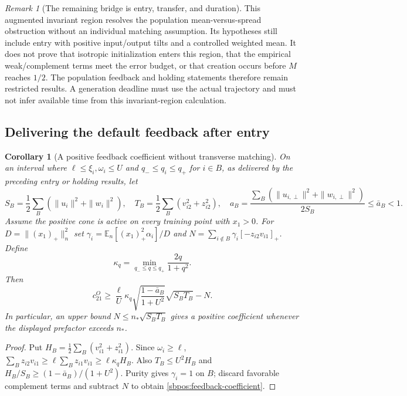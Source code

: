 \documentclass{article} %
\theoremstyle{plain}
\newtheorem{corollary}[theorem]{Corollary}
\theoremstyle{definition}
\theoremstyle{remark}
\newtheorem{remark}[theorem]{Remark}
\begin{document}
\begin{remark}[The remaining bridge is entry, transfer, and duration]
This augmented invariant region resolves the population mean-versus-spread
obstruction without an individual matching assumption. Its hypotheses
still include entry with positive input/output tilts and a controlled
weighted mean. It does not prove that isotropic initialization enters
this region, that the empirical weak/complement terms meet the error
budget, or that creation occurs before $M$ reaches $1/2$.
The population feedback and holding statements therefore remain
restricted results. A generation deadline must use the actual trajectory
and must not infer available time from this invariant-region calculation.
\end{remark}

\subsection{Delivering the default feedback after entry}

\begin{corollary}[A positive feedback coefficient without transverse matching]
\label{sbpos:feedback}
On an interval where $\ell\le\xi_i,\omega_i\le U$ and
$q_-\le q_i\le q_+$ for $i\in B$, as delivered by the preceding
entry or holding results, let
\[
 S_B=\frac12\sum_B(\|u_i\|^2+\|w_i\|^2),\quad
 T_B=\frac12\sum_B(v_{i2}^2+z_{i2}^2),\quad
 a_B=\frac{\sum_B(\|u_{i,\perp}\|^2+\|w_{i,\perp}\|^2)}{2S_B}
       \le\bar a_B<1.
\]
Assume the positive cone is active on every training point with $x_1>0$.
For $D=\|(x_1)_+\|_n^2$ set
$\gamma_i=\mathbb E_n[(x_1)_+^2\alpha_i]/D$ and
$N=\sum_{i\notin B}\gamma_i[-z_{i2}v_{i1}]_+$.
Define
\[
 \kappa_q=\min_{q_-\le q\le q_+}\frac{2q}{1+q^2}.
\]
Then
\begin{equation}\label{sbpos:feedback-coefficient}
 c_{21}^O\ge
 \frac{\ell}{U}\kappa_q
       \sqrt{\frac{1-\bar a_B}{1+U^2}}\sqrt{S_BT_B}-N.
\end{equation}
In particular, an upper bound $N\le n_*\sqrt{S_BT_B}$ gives a positive
coefficient whenever the displayed prefactor exceeds $n_*$.
\end{corollary}
\begin{proof}
Put $H_B=\frac12\sum_B(v_{i1}^2+z_{i1}^2)$.
Since $\omega_i\ge\ell$,
$\sum_Bz_{i2}v_{i1}\ge\ell\sum_Bz_{i1}v_{i1}
\ge\ell\kappa_q H_B$.
Also $T_B\le U^2H_B$ and
$H_B/S_B\ge(1-\bar a_B)/(1+U^2)$.
Purity gives $\gamma_i=1$ on $B$; discard favorable complement terms
and subtract $N$ to obtain \eqref{sbpos:feedback-coefficient}.
\end{proof}
\end{document}
